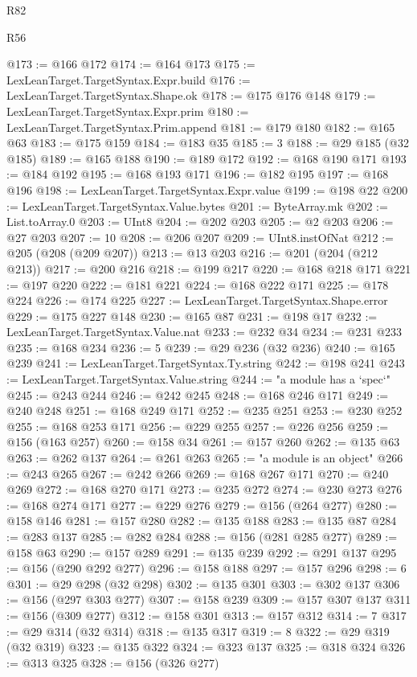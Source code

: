 \begin{lexlean}{R82}
\begin{lexlean}{R56}
\begin{coremodule}
{{{{{{{{{{{{{{{{{{{{{{{{{{{{{{{{{{{{{{{{{{{{{{{{{{{{{{{{{{{{{{{{{{{{{{{{{{{{{{{{{{{{{{{{{{{{{{{{{{{{{{{{{{{{{{{{{{{{{{{{{{{{{{{{{{{{{{{{{{{{{{{{{{{{{{{{{{{{{{{{{{{{{{{{{{{{{{{{{{{{{{{{{{{{{{{{{{{{{{{{{{{{{{{{{{{@173 := @166 @172
@174 := @164 @173
@175 := LexLeanTarget.TargetSyntax.Expr.build
@176 := LexLeanTarget.TargetSyntax.Shape.ok
@178 := @175 @176 @148
@179 := LexLeanTarget.TargetSyntax.Expr.prim
@180 := LexLeanTarget.TargetSyntax.Prim.append
@181 := @179 @180
@182 := @165 @63
@183 := @175 @159
@184 := @183 @35
@185 := 3
@188 := @29 @185 (@32 @185)
@189 := @165 @188
@190 := @189 @172
@192 := @168 @190 @171
@193 := @184 @192
@195 := @168 @193 @171
@196 := @182 @195
@197 := @168 @196
@198 := LexLeanTarget.TargetSyntax.Expr.value
@199 := @198 @22
@200 := LexLeanTarget.TargetSyntax.Value.bytes
@201 := ByteArray.mk
@202 := List.toArray.{0}
@203 := UInt8
@204 := @202 @203
@205 := @2 @203
@206 := @27 @203
@207 := 10
@208 := @206 @207
@209 := UInt8.instOfNat
@212 := @205 (@208 (@209 @207))
@213 := @13 @203
@216 := @201 (@204 (@212 @213))
@217 := @200 @216
@218 := @199 @217
@220 := @168 @218 @171
@221 := @197 @220
@222 := @181 @221
@224 := @168 @222 @171
@225 := @178 @224
@226 := @174 @225
@227 := LexLeanTarget.TargetSyntax.Shape.error
@229 := @175 @227 @148
@230 := @165 @87
@231 := @198 @17
@232 := LexLeanTarget.TargetSyntax.Value.nat
@233 := @232 @34
@234 := @231 @233
@235 := @168 @234
@236 := 5
@239 := @29 @236 (@32 @236)
@240 := @165 @239
@241 := LexLeanTarget.TargetSyntax.Ty.string
@242 := @198 @241
@243 := LexLeanTarget.TargetSyntax.Value.string
@244 := "a module has a `spec`"
@245 := @243 @244
@246 := @242 @245
@248 := @168 @246 @171
@249 := @240 @248
@251 := @168 @249 @171
@252 := @235 @251
@253 := @230 @252
@255 := @168 @253 @171
@256 := @229 @255
@257 := @226 @256
@259 := @156 (@163 @257)
@260 := @158 @34
@261 := @157 @260
@262 := @135 @63
@263 := @262 @137
@264 := @261 @263
@265 := "a module is an object"
@266 := @243 @265
@267 := @242 @266
@269 := @168 @267 @171
@270 := @240 @269
@272 := @168 @270 @171
@273 := @235 @272
@274 := @230 @273
@276 := @168 @274 @171
@277 := @229 @276
@279 := @156 (@264 @277)
@280 := @158 @146
@281 := @157 @280
@282 := @135 @188
@283 := @135 @87
@284 := @283 @137
@285 := @282 @284
@288 := @156 (@281 @285 @277)
@289 := @158 @63
@290 := @157 @289
@291 := @135 @239
@292 := @291 @137
@295 := @156 (@290 @292 @277)
@296 := @158 @188
@297 := @157 @296
@298 := 6
@301 := @29 @298 (@32 @298)
@302 := @135 @301
@303 := @302 @137
@306 := @156 (@297 @303 @277)
@307 := @158 @239
@309 := @157 @307 @137
@311 := @156 (@309 @277)
@312 := @158 @301
@313 := @157 @312
@314 := 7
@317 := @29 @314 (@32 @314)
@318 := @135 @317
@319 := 8
@322 := @29 @319 (@32 @319)
@323 := @135 @322
@324 := @323 @137
@325 := @318 @324
@326 := @313 @325
@328 := @156 (@326 @277)
}}}}}}}}}}}}}}}}}}}}}}}}}}}}}}}}}}}}}}}}}}}}}}}}}}}}}}}}}}}}}}}}}}}}}}}}}}}}}}}}}}}}}}}}}}}}}}}}}}}}}}}}}}}}}}}}}}}}}}}}}}}}}}}}}}}}}}}}}}}}}}}}}}}}}}}}}}}}}}}}}}}}}}}}}}}}}}}}}}}}}}}}}}}}}}}}}}}}}}}}}}}}}}}}}}}
\end{coremodule}
\end{lexlean}
\end{lexlean}
